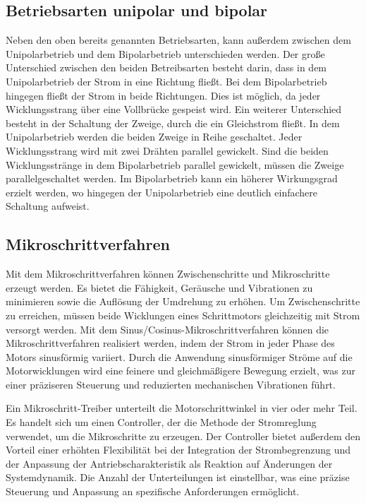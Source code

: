 \subsection{Betriebsarten unipolar und bipolar}

Neben den oben bereits genannten Betriebsarten, kann außerdem zwischen dem Unipolarbetrieb und dem Bipolarbetrieb unterschieden werden. Der große Unterschied zwischen den beiden Betreibsarten besteht darin, dass in dem Unipolarbetrieb der Strom in eine Richtung fließt. Bei dem Bipolarbetrieb hingegen fließt der Strom in beide Richtungen. Dies ist möglich, da jeder Wicklungsstrang über eine Vollbrücke gespeist wird. Ein weiterer Unterschied besteht in der Schaltung der Zweige, durch die ein Gleichstrom fließt. In dem Unipolarbetrieb werden die beiden Zweige in Reihe geschaltet. Jeder Wicklungsstrang wird mit zwei Drähten parallel gewickelt. Sind die beiden Wicklungsstränge in dem Bipolarbetrieb parallel gewickelt, müssen die Zweige parallelgeschaltet werden. Im Bipolarbetrieb kann ein höherer Wirkungsgrad erzielt werden, wo hingegen der Unipolarbetrieb eine deutlich einfachere Schaltung aufweist. \cite{Schroeder:2021}

\subsection{Mikroschrittverfahren}

Mit dem Mikroschrittverfahren können Zwischenschritte und Mikroschritte erzeugt werden. Es bietet die Fähigkeit, Geräusche und Vibrationen zu minimieren sowie die Auflösung der Umdrehung zu erhöhen. Um Zwischenschritte zu erreichen, müssen beide Wicklungen eines Schrittmotors gleichzeitig mit Strom versorgt werden. 
Mit dem Sinus/Cosinus-Mikroschrittverfahren können die Mikroschrittverfahren realisiert werden, indem der Strom in jeder Phase des Motors sinusförmig variiert. Durch die Anwendung sinusförmiger Ströme auf die Motorwicklungen wird eine feinere und gleichmäßigere Bewegung erzielt, was zur einer präziseren Steuerung und reduzierten mechanischen Vibrationen führt.\cite{McComb:2024}

Ein Mikroschritt-Treiber unterteilt die Motorschrittwinkel in vier oder mehr Teil. Es handelt sich um einen Controller, der die Methode der Stromreglung verwendet, um die Mikroschritte zu erzeugen. Der Controller bietet außerdem den Vorteil einer erhöhten Flexibilität bei der Integration der Strombegrenzung und der Anpassung der Antriebscharakteristik als Reaktion auf Änderungen der Systemdynamik. Die Anzahl der Unterteilungen ist einstellbar, was eine präzise Steuerung und Anpassung an spezifische Anforderungen ermöglicht.\cite{Babiel:2023}

